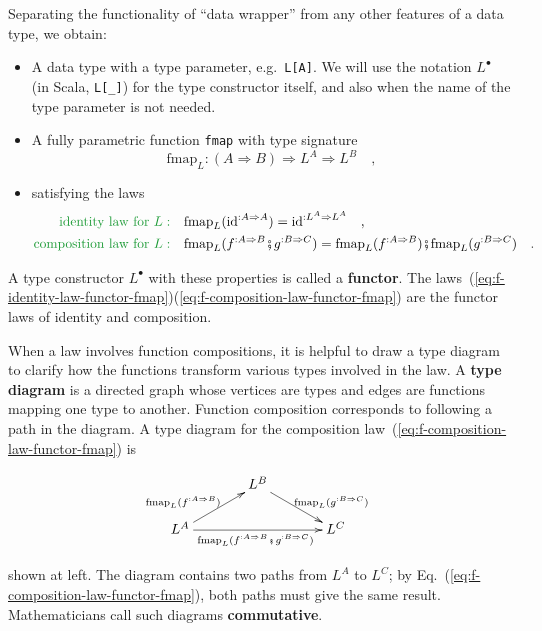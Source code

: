Separating the functionality of ``data wrapper'' from any other
features of a data type, we obtain:
\begin{itemize}
\item A data type with a type parameter, e.g.~\lstinline!L[A]!. We will
use the notation $L^{\bullet}$ (in Scala, \lstinline!L[_]!) for
the type constructor itself, and also when the name of the type parameter
is not needed.
\item A fully parametric function \lstinline!fmap! with type signature
\[
\text{fmap}_{L}:\left(A\Rightarrow B\right)\Rightarrow L^{A}\Rightarrow L^{B}\quad,
\]
\item satisfying the laws
\begin{align}
{\color{greenunder}\text{identity law for }L:}\quad & \text{fmap}_{L}(\text{id}^{:A\Rightarrow A})=\text{id}^{:L^{A}\Rightarrow L^{A}}\quad,\label{eq:f-identity-law-functor-fmap}\\
{\color{greenunder}\text{composition law for }L:}\quad & \text{fmap}_{L}(f^{:A\Rightarrow B}\bef g^{:B\Rightarrow C})=\text{fmap}_{L}(f^{:A\Rightarrow B})\bef\text{fmap}_{L}(g^{:B\Rightarrow C})\quad.\label{eq:f-composition-law-functor-fmap}
\end{align}
\end{itemize}
A type constructor $L^{\bullet}$ with these properties is called
a \textbf{functor}. The laws~(\ref{eq:f-identity-law-functor-fmap})\textendash (\ref{eq:f-composition-law-functor-fmap})
are the functor laws of identity and composition. 

When a law involves function compositions, it is helpful to draw a
type diagram to clarify how the functions transform
various types involved in the law. A \textbf{type diagram}
is a directed graph whose vertices are types and edges are functions
mapping one type to another. Function composition corresponds to following
a path in the diagram. A type diagram for the composition law~(\ref{eq:f-composition-law-functor-fmap})
is\begin{wrapfigure}{l}{0.4\columnwidth}%
\vspace{-1.9\baselineskip}
\[
\xymatrix{\xyScaleY{1.5pc}\xyScaleX{3pc} & L^{B}\ar[rd]\sp(0.6){\ \text{fmap}_{L}(g^{:B\Rightarrow C})\ }\\
L^{A}\ar[ru]\sp(0.4){\text{fmap}_{L}(f^{:A\Rightarrow B})\ }\ar[rr]\sb(0.5){\text{fmap}_{L}(f^{:A\Rightarrow B}\bef g^{:B\Rightarrow C})\ } &  & L^{C}
}
\]

\vspace{-2\baselineskip}
\end{wrapfigure}%
shown at left. The diagram contains two paths from $L^{A}$ to $L^{C}$;
by Eq.~(\ref{eq:f-composition-law-functor-fmap}), both paths must
give the same result. Mathematicians call such diagrams \textbf{commutative}.

